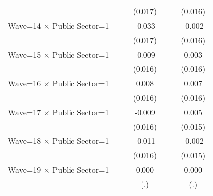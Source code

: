 {\begin{tabular}{l*{6}{c}}
                    &                     &                     &     (0.017)         &                     &                     &     (0.016)         \\
Wave=14 $\times$ Public Sector=1&                     &                     &      -0.033\sym{**} &                     &                     &      -0.002         \\
                    &                     &                     &     (0.017)         &                     &                     &     (0.016)         \\
Wave=15 $\times$ Public Sector=1&                     &                     &      -0.009         &                     &                     &       0.003         \\
                    &                     &                     &     (0.016)         &                     &                     &     (0.016)         \\
Wave=16 $\times$ Public Sector=1&                     &                     &       0.008         &                     &                     &       0.007         \\
                    &                     &                     &     (0.016)         &                     &                     &     (0.016)         \\
Wave=17 $\times$ Public Sector=1&                     &                     &      -0.009         &                     &                     &       0.005         \\
                    &                     &                     &     (0.016)         &                     &                     &     (0.015)         \\
Wave=18 $\times$ Public Sector=1&                     &                     &      -0.011         &                     &                     &      -0.002         \\
                    &                     &                     &     (0.016)         &                     &                     &     (0.015)         \\
Wave=19 $\times$ Public Sector=1&                     &                     &       0.000         &                     &                     &       0.000         \\
                    &                     &                     &         (.)         &                     &                     &         (.)         \\

\end{tabular}}
